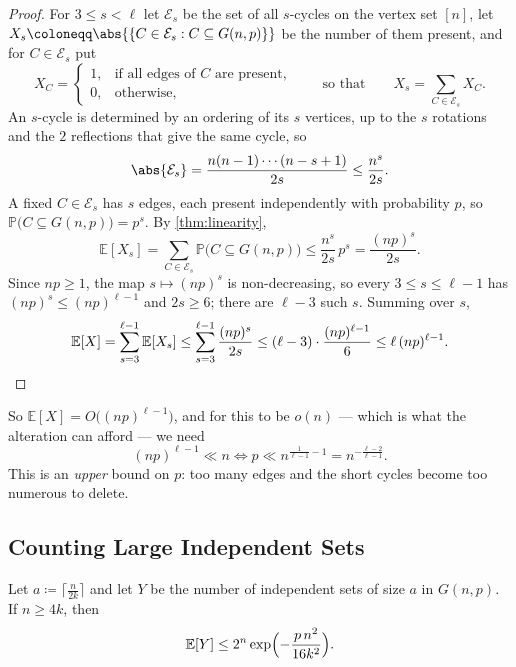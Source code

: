 \begin{proof}
    For \(3 \le s < \ell\) let \(\mathcal{E}_s\) be the set of all \(s\)-cycles on the vertex set \([n]\), let \(X_s \coloneqq \abs{\{C \in \mathcal{E}_s : C \subseteq G(n,p)\}}\) be the number of them present, and for \(C \in \mathcal{E}_s\) put
    \[
        X_C = \begin{cases}
            1, & \text{if all edges of } C \text{ are present}, \\
            0, & \text{otherwise},
        \end{cases}
        \qquad\text{so that}\qquad
        X_s = \sum_{C \in \mathcal{E}_s} X_C .
    \]
    An \(s\)-cycle is determined by an ordering of its \(s\) vertices, up to the \(s\) rotations and the \(2\) reflections that give the same cycle, so
    \[
        \abs{\mathcal{E}_s} = \frac{n (n-1) \cdots (n - s + 1)}{2s} \le \frac{n^{s}}{2s}.
    \]
    A fixed \(C \in \mathcal{E}_s\) has \(s\) edges, each present independently with probability \(p\), so \(\mathbb{P}\bigl( C \subseteq G(n,p) \bigr) = p^{s}\). By \autoref{thm:linearity},
    \[
        \mathbb{E}[X_s] = \sum_{C \in \mathcal{E}_s} \mathbb{P}\bigl( C \subseteq G(n,p) \bigr) \le \frac{n^{s}}{2s} \, p^{s} = \frac{(np)^{s}}{2s}.
    \]
    Since \(np \ge 1\), the map \(s \mapsto (np)^{s}\) is non-decreasing, so every \(3 \le s \le \ell - 1\) has \((np)^{s} \le (np)^{\ell-1}\) and \(2s \ge 6\); there are \(\ell - 3\) such \(s\). Summing over \(s\),
    \[
        \mathbb{E}[X] = \sum_{s=3}^{\ell-1} \mathbb{E}[X_s] \le \sum_{s=3}^{\ell-1} \frac{(np)^{s}}{2s} \le (\ell - 3) \cdot \frac{(np)^{\ell-1}}{6} \le \ell \, (np)^{\ell-1}. \qedhere
    \]
\end{proof}

So \(\mathbb{E}[X] = O\bigl( (np)^{\ell-1} \bigr)\), and for this to be \(o(n)\) --- which is what the alteration can afford --- we need
\[
    (np)^{\ell - 1} \ll n
    \iff p \ll n^{\frac{1}{\ell-1} - 1} = n^{- \frac{\ell-2}{\ell-1}}.
\]
This is an \emph{upper} bound on \(p\): too many edges and the short cycles become too numerous to delete.

\subsection{Counting Large Independent Sets}

\begin{lemma}\label{lem:few-indep-sets}
    Let \(a \coloneqq \bigl\lceil \frac{n}{2k} \bigr\rceil\) and let \(Y\) be the number of independent sets of size \(a\) in \(G(n,p)\). If \(n \ge 4k\), then
    \[
        \mathbb{E}[Y] \le 2^{n} \exp\Bigl( - \frac{p \, n^{2}}{16 k^{2}} \Bigr).
    \]
\end{lemma}


